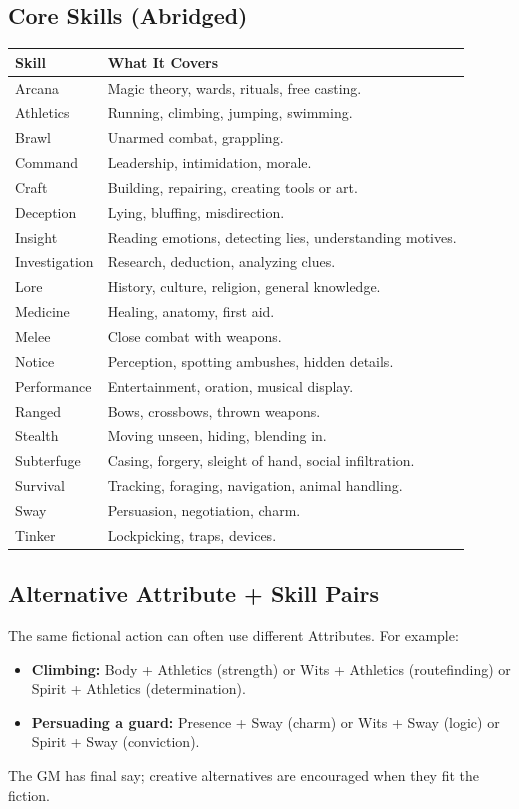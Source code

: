 \subsection{Core Skills (Abridged)}
\begin{longtable}{p{3cm} p{10cm}}
\toprule
\textbf{Skill} & \textbf{What It Covers} \\
\midrule
Arcana & Magic theory, wards, rituals, free casting. \\
Athletics & Running, climbing, jumping, swimming. \\
Brawl & Unarmed combat, grappling. \\
Command & Leadership, intimidation, morale. \\
Craft & Building, repairing, creating tools or art. \\
Deception & Lying, bluffing, misdirection. \\
Insight & Reading emotions, detecting lies, understanding motives. \\
Investigation & Research, deduction, analyzing clues. \\
Lore & History, culture, religion, general knowledge. \\
Medicine & Healing, anatomy, first aid. \\
Melee & Close combat with weapons. \\
Notice & Perception, spotting ambushes, hidden details. \\
Performance & Entertainment, oration, musical display. \\
Ranged & Bows, crossbows, thrown weapons. \\
Stealth & Moving unseen, hiding, blending in. \\
Subterfuge & Casing, forgery, sleight of hand, social infiltration. \\
Survival & Tracking, foraging, navigation, animal handling. \\
Sway & Persuasion, negotiation, charm. \\
Tinker & Lockpicking, traps, devices. \\
\bottomrule
\end{longtable}

\subsection{Alternative Attribute + Skill Pairs}
The same fictional action can often use different Attributes. For example:

\begin{itemize}
    \item \textbf{Climbing:} Body + Athletics (strength) or Wits + Athletics
        (routefinding) or Spirit + Athletics (determination).
    \item \textbf{Persuading a guard:} Presence + Sway (charm) or Wits + Sway
        (logic) or Spirit + Sway (conviction).
\end{itemize}
The GM has final say; creative alternatives are encouraged when they fit the
fiction.

